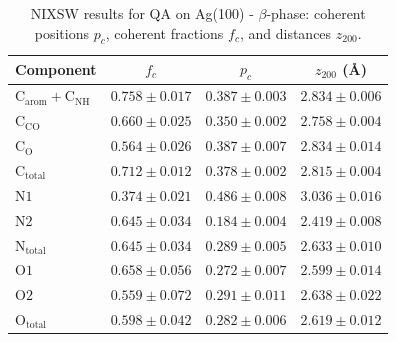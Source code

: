 \documentclass[11pt,a4paper]{article}
\begin{document}
\begin{table}[H]
    \centering
    \caption{NIXSW results for QA on Ag(100) - $\beta$-phase: coherent positions $p_c$, coherent fractions $f_c$, and distances $z_{200}$.}
    \begin{tabular}{@{}lccc@{}} \toprule
        Component & $f_c$ & $p_c$ & $z_{200}$ (\si{\angstrom}) \\
        \midrule
        $\mathrm{C_{arom}}+\mathrm{C_{NH}}$ & $0.758 \pm 0.017$ & $0.387 \pm 0.003$ & $2.834 \pm 0.006$ \\
        $\mathrm{C_{CO}}$ & $0.660 \pm 0.025$ & $0.350 \pm 0.002$ & $2.758 \pm 0.004$ \\
        $\mathrm{C_{O}}$ & $0.564 \pm 0.026$ & $0.387 \pm 0.007$ & $2.834 \pm 0.014$ \\
        $\mathrm{C_{total}}$ & $0.712 \pm 0.012$ & $0.378 \pm 0.002$ & $2.815 \pm 0.004$ \\ \midrule
        $\mathrm{N1}$ & $0.374 \pm 0.021$ & $0.486 \pm 0.008$ & $3.036 \pm 0.016$ \\
        $\mathrm{N2}$ & $0.645 \pm 0.034$ & $0.184 \pm 0.004$ & $2.419 \pm 0.008$ \\
        $\mathrm{N_{total}}$ & $0.645 \pm 0.034$ & $0.289 \pm 0.005$ & $2.633 \pm 0.010$ \\ \midrule
        $\mathrm{O1}$ & $0.658 \pm 0.056$ & $0.272 \pm 0.007$ & $2.599 \pm 0.014$ \\
        $\mathrm{O2}$ & $0.559 \pm 0.072$ & $0.291 \pm 0.011$ & $2.638 \pm 0.022$ \\
        $\mathrm{O_{total}}$ & $0.598 \pm 0.042$ & $0.282 \pm 0.006$ & $2.619 \pm 0.012$ \\
        \bottomrule
    \end{tabular}
    \label{tab:NIXSW-beta-phase}
\end{table}
\end{document}
